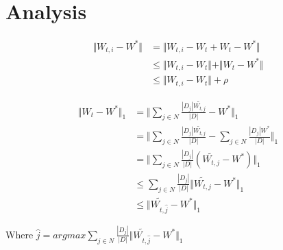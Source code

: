\section{Analysis}

\newcommand{\wti}{W_{t,i}}
\newcommand{\wtj}{W_{t,j}}
\newcommand{\wt}{W_{t}}
\newcommand{\norm}[1]{\Vert #1 \Vert_{1}}


\begin{equation}
\begin{split}
	\Vert \wti - W^*\Vert & = \Vert \wti -\wt + \wt - W^*\Vert \\
                      & \leq \Vert \wti -\wt \Vert + \Vert \wt - W^* \Vert \\
                      & \leq \Vert \wti -\wt \Vert + \rho	
\end{split}
\end{equation}

\begin{equation}
\begin{split}
	\norm{\wt -W^*}  & = \norm{\sum_{j\in N} \frac{|D_j|\widetilde{\wtj}}{|D|} - W^*}  \\
	& = \norm{\sum_{j\in N} \frac{|D_j|\tilde{\wtj}}{|D|} - \sum_{j\in N} \frac{|D_j|W^*}{|D|}} \\
	& = \norm{ \sum_{j\in N} \frac{|D_j|}{|D|} ( \widetilde{\wtj} -W^* ) } \\
	& \leq \sum_{j\in N} \frac{|D_j|}{|D|} \norm{\widetilde{\wtj} -W^* } \\
	& \leq \norm{\widetilde{W_{t,\hat{j}} } - W^*}
\end{split}
\end{equation}

Where $\hat{j} = argmax \sum_{j\in N} \frac{|D_j|}{|D|} \norm{\widetilde{W_{t,\hat{j}} } - W^*}$ 


